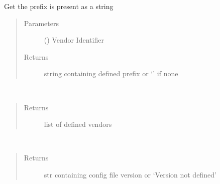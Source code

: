 \documentclass[letterpaper,10pt,english]{sphinxmanual}
\begin{document}
\begin{fulllineitems}
\begin{fulllineitems}
\end{fulllineitems}


\begin{fulllineitems}
\label{\detokenize{dhcp-option-data-class:bloxone.DHCP_OPTION_DEFS.vendor_prefix}}
\sphinxAtStartPar
Get the prefix is present as a string
\begin{quote}\begin{description}
\item[{Parameters}] \leavevmode
\sphinxAtStartPar
{} () \textendash{} Vendor Identifier

\item[{Returns}] \leavevmode
\sphinxAtStartPar
string containing defined prefix or ‘’ if none

\end{description}\end{quote}

\end{fulllineitems}


\begin{fulllineitems}
\label{\detokenize{dhcp-option-data-class:bloxone.DHCP_OPTION_DEFS.vendors}}~\begin{quote}\begin{description}
\item[{Returns}] \leavevmode
\sphinxAtStartPar
list of defined vendors

\end{description}\end{quote}

\end{fulllineitems}


\begin{fulllineitems}
\label{\detokenize{dhcp-option-data-class:bloxone.DHCP_OPTION_DEFS.version}}~\begin{quote}\begin{description}
\item[{Returns}] \leavevmode
\sphinxAtStartPar
str containing config file version or ‘Version not defined’

\end{description}\end{quote}

\end{fulllineitems}


\end{fulllineitems}
\end{document}
